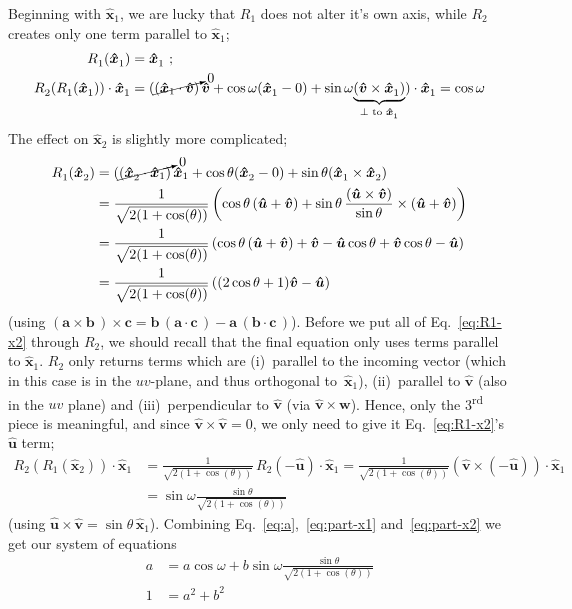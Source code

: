 \documentclass[12pt, nofootinbib, notitlepage]{revtex4-1}
\renewcommand{\vec}[1]{\boldsymbol{#1}}
\newcommand{\vecN}[1]{\vec{\hat{#1}}}
\newcommand{\ds}{^{}}
\newcommand{\vict}{\vec{w}}
\newcommand{\ax}{\vecN{x}}
\newcommand{\super}[2]{#1\textsuperscript{#2}}
\begin{document}
Beginning with $\ax_1\ds$, we are lucky that 
$R_1\ds$ does not alter it's own axis, 
while $R_2\ds$ creates only one term parallel to $\ax_1\ds$;
\begin{align}\label{eq:part-x1}
	R_1\ds(\ax_1\ds) & = \ax_1\ds\,\,;\\
	R_2\ds(R_1\ds(\ax_1\ds))\cdot\ax_1\ds
	& = (\cancelto{0}{(\ax_1\cdot\vecN{v})}\,\vecN{v}
		+ \cos\omega(\ax_1\ds - 0) 
		+ \sin\omega\underset{\bot\text{ to }\ax_1\ds}{\underbrace
			{(\vecN{v}\times\ax_1\ds)}})\cdot\ax_1\ds = \cos\omega
\end{align}
The effect on $\ax_2\ds$ is slightly more complicated;
\begin{align}\label{eq:R1-x2}
	R_1\ds(\ax_2\ds) 
		& = (\cancelto{0}{(\ax_2\ds\cdot\ax_1)}\,\ax_1
		+ \cos\theta(\ax_2\ds - 0) + \sin\theta(\ax_1\ds\times\ax_2\ds)\nonumber\\
		& = \frac{1}{\sqrt{2(1+\cos(\theta))}}
		\left(\cos\theta\,(\vecN{u}+\vecN{v}) 
			+ \sin\theta\,\frac{(\vecN{u}\times\vecN{v})}{\sin\theta}\times(\vecN{u}+\vecN{v})\right)\nonumber\\
		& = \frac{1}{\sqrt{2(1+\cos(\theta))}}
		\left(\cos\theta\,(\vecN{u}+\vecN{v}) + 
		\vecN{v} - \vecN{u}\cos\theta + \vecN{v}\cos\theta - \vecN{u}\right)\nonumber\\
		& = \frac{1}{\sqrt{2(1+\cos(\theta))}}
		\left((2\cos\theta + 1)\vecN{v} - \vecN{u}\right)
\end{align}
(using ${(\vec{a}\times\vec{b}\,)\times\vec{c} 
	= \vec{b}\,(\vec{a}\cdot\vec{c}\,) - \vec{a}\,(\vec{b}\cdot\vec{c}\,)}$).
Before we put all of Eq.~\ref{eq:R1-x2} through $R_2\ds$, 
we should recall that the final equation only uses terms parallel to $\ax_1\ds$. 
$R_2\ds$ only returns terms which are 
(i)~parallel to the incoming vector 
(which in this case is in the $uv$-plane, and thus orthogonal to~$\ax_1\ds$), 
(ii)~parallel to $\vecN{v}$ (also in the $uv$ plane) and 
(iii)~perpendicular to $\vecN{v}$ (via $\vecN{v}\times\vict$).
Hence, only the \super{3}{rd} piece is meaningful, 
and since $\vecN{v}\times\vecN{v}=0$, 
we only need to give it Eq.~\ref{eq:R1-x2}'s $\vecN{u}$ term;
\begin{align}\label{eq:part-x2}
	R_2\ds(R_1\ds(\ax_2\ds))\cdot\ax_1\ds
		& = \frac{1}{\sqrt{2(1+\cos(\theta))}} \,R_2\ds(-\vecN{u})\cdot\ax_1\ds
		= \frac{1}{\sqrt{2(1+\cos(\theta))}} (\vecN{v}\times(-\vecN{u}))\cdot\ax_1\ds\nonumber\\
		& = \sin\omega\frac{\sin\theta}{\sqrt{2(1+\cos(\theta))}}
\end{align}
(using $\vecN{u}\times\vecN{v} = \sin\theta\,\ax_1\ds$).
Combining Eq.~\ref{eq:a},~\ref{eq:part-x1} and~\ref{eq:part-x2} 
we get our system of equations
\begin{align}
	a & = a \cos\omega + b\sin\omega\frac{\sin\theta}{\sqrt{2(1+\cos(\theta))}}\\
	1 &= a^2 + b^2
\end{align}
\end{document}
